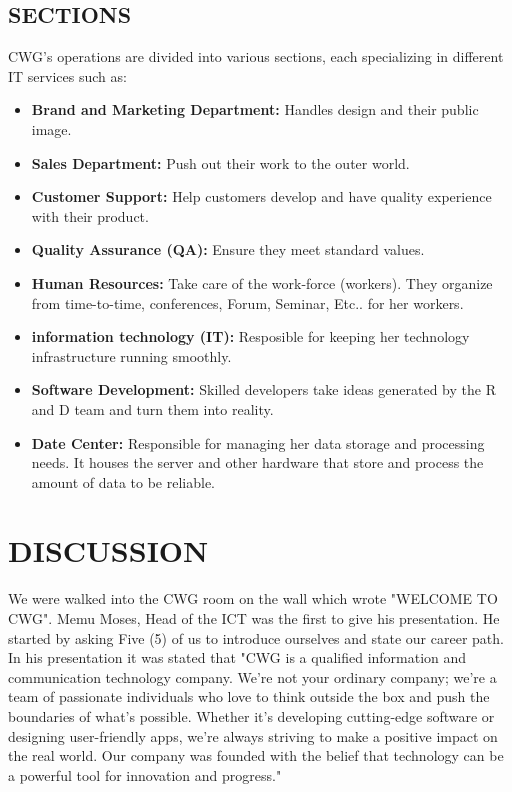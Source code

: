 \documentclass[a4paper,12pt]{report}
\begin{document}
\section[Sections]{SECTIONS}
CWG’s operations are divided into various sections, each specializing in different IT services such as:
\begin{itemize}
    \item \textbf{Brand and Marketing Department:} Handles design and their public image. 
    \item \textbf{Sales Department:} Push out their work to the outer world.
    \item \textbf{Customer Support:} Help customers develop and have quality experience with their product.
    \item \textbf{Quality Assurance (QA):} Ensure they meet standard values.
    \item \textbf{Human Resources:} Take care of the work-force (workers). They organize from time-to-time, conferences, Forum, Seminar, Etc.. for her workers.
    \item \textbf{information technology (IT):} Resposible for keeping her technology infrastructure running smoothly.
    \item \textbf{Software Development:} Skilled developers take ideas generated by the R and D team and turn them into reality.
    \item \textbf{Date Center:} Responsible for managing her data storage and processing needs. It houses the server and other hardware that store and process the amount of data to be reliable.
\end{itemize}

\chapter[Chapter 3]{DISCUSSION}
We were walked into the CWG room on the wall which wrote "WELCOME TO CWG". Memu Moses, Head of the ICT was the first to give his presentation. He started by asking Five (5) of us to introduce ourselves and state our career path. In his presentation it was stated that "CWG is a qualified information and communication technology company. We're not your ordinary company; we're a team of passionate individuals who love to think outside the box and push the boundaries of what's possible. Whether it's developing cutting-edge software or designing user-friendly apps, we're always striving to make a positive impact on the real world. Our company was founded with the belief that technology can be a powerful tool for innovation and progress."
\end{document}
